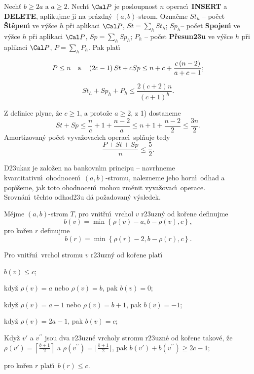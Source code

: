Nech\v t $b\ge 2a$ a $a\ge 2$. Nech\v t $\Cal P$ je 
posloupnost $n$ operac\'\i\ {\bf INSERT} a {\bf DELETE}, aplikujme ji na 
pr\'azdn\'y $\left(a,b\right)$-strom. Ozna\v cme\newline 
$St_h$ -- po\v cet {\bf \v St\v epen\'\i} ve v\'y\v sce $h$ p\v ri aplikaci $
\Cal P$, $St=\sum_hSt_h$;\newline 
$Sp_h$-- po\v cet {\bf Spojen\'\i} ve v\'y\v sce $h$ p\v ri aplikaci $
\Cal P$, 
$Sp=\sum_hSp_h$;\newline 
$P_h$ -- po\v cet {\bf P\v resun\accent23u} ve v\'y\v sce $h$ p\v ri aplikaci $
\Cal P$, 
$P=\sum_hP_h$.\newline 
Pak plat\'\i
\roster
\item
$$P\le n\quad \text{\rm a}\quad \left(2c-1\right)St+cSp\le n+c+\frac {c\left(n-2\right)}{a+c-1};$$
\item
$$St_h+Sp_h+P_h\le\frac {2\left(c+2\right)n}{\left(c+1\right)^h}.$$
\endroster
\endproclaim


\flushpar Z definice plyne, \v ze $c\ge 1$, a proto\v ze $a\ge 2$, z 1) dostaneme
$$St+Sp\le\frac nc+1+\frac {n-2}a\le n+1+\frac {n-2}2\le\frac {3n}
2.$$
Amortizovan\'y po\v cet vyva\v zovac\'\i ch operac\'\i\ spl\v nuje tedy 
$$\frac {P+St+Sp}n\le\frac 52.$$
\medskip

\flushpar D\accent23ukaz je zalo\v zen na bankovn\'\i m principu -- 
navrhneme kvantitativn\'\i\ ohodnocen\'\i\ $\left(a,b\right)$-stromu, 
nalezneme jeho horn\'\i\ odhad a pop\'\i\v seme, jak 
toto ohodnocen\'\i\ mohou zm\v enit vyva\v zo\-vac\'\i\ ope\-race. Srovn\'an\'\i\ 
t\v echto odhad\accent23u d\'a po\v zadovan\'y v\'ysledek.
\medskip

\flushpar M\v ejme $\left(a,b\right)$-strom $T$, pro vnit\v rn\'\i\ vrchol 
$v$ r\accent23uzn\'y od ko\v rene definuj\-me 
$$b\left(v\right)=\min\left\{\rho \left(v\right)-a,b-\rho \left(v\right),c\right\},$$ pro 
ko\v ren $r$ definuj\-me $$b\left(r\right)=\min\left\{\rho \left(r\right)-2,b-\rho \left(r\right),c\right\}.$$ 
\medskip

Pro vnit\v rn\'\i\ vrchol stromu $v$  
r\accent23uzn\'y od ko\v rene plat\'\i
\roster
\item
$b\left(v\right)\le c$;
\item
kdy\v z $\rho \left(v\right)=a$ nebo $\rho \left(v\right)=b$, pak $b\left(v\right)=0$;
\item
kdy\v z $\rho \left(v\right)=a-1$ nebo $\rho \left(v\right)=b+1$, pak $b\left(v\right)=-1$;
\item
kdy\v z $\rho \left(v\right)=2a-1$, pak $b\left(v\right)=c$;
\item
Kdy\v z $v'$ a $v^{\prime\prime}$ jsou dva r\accent23uzn\'e vrcholy stromu 
r\accent23uzn\'e od ko\v rene takov\'e, \v ze $\rho \left(v'\right)=\left\lceil\frac {
b+1}2\right\rceil$ a 
$\rho \left(v^{\prime\prime}\right)=\lfloor\frac {b+1}2\rfloor$, pak $b\left(v'\right)+
b\left(v^{\prime\prime}\right)\ge 2c-1$;
\item
pro ko\v ren $r$ plat\'\i\ $b\left(r\right)\le c$.
\endroster
\endproclaim

